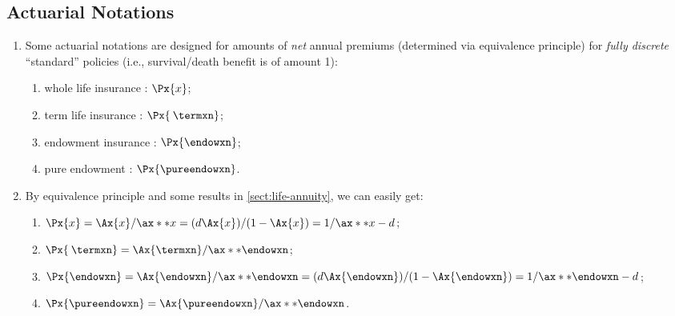 \subsection{Actuarial Notations}
\begin{enumerate}
\item \label{it:net-annual-prem-notations}
Some actuarial notations are designed for amounts of \emph{net} annual premiums
(determined via equivalence principle) for \emph{fully discrete} ``standard''
policies (i.e., survival/death benefit is of amount 1):
 \begin{enumerate}
\item whole life insurance \textbar{}:
\(\Px{x}\);
\item term life insurance \textbar{}: \(\Px{\:\termxn}\);
\item endowment insurance \textbar{}\textbar{}: \(\Px{\endowxn}\);
\item pure endowment : \(\Px{\pureendowxn}\).
\end{enumerate}

\item \label{it:net-prem-fmlas}
By equivalence principle and some results in \cref{sect:life-annuity}, we can
easily get:
\begin{enumerate}
\item \(\Px{x}=\Ax{x}/\ax**{x}=(d\Ax{x})/(1-\Ax{x})=1/\ax**{x}-d\);
\item \(\Px{\:\termxn}=\Ax{\termxn}/\ax**{\endowxn}\);
\item \(\Px{\endowxn}=\Ax{\endowxn}/\ax**{\endowxn}=(d\Ax{\endowxn})/(1-\Ax{\endowxn})=1/\ax**{\endowxn}-d\);
\item \(\Px{\pureendowxn}=\Ax{\pureendowxn}/\ax**{\endowxn}\).
\end{enumerate}



\end{enumerate}
